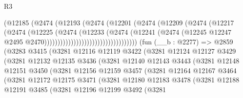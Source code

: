 \begin{lexlean}{R3}
\begin{coremodule}
                                        (@12185
                                          (@2474
                                            (@12193
                                              (@2474
                                                (@12201
                                                  (@2474
                                                    (@12209
                                                      (@2474
                                                        (@12217
                                                          (@2474
                                                            (@12225
                                                              (@2474
                                                                (@12233
                                                                  (@2474
                                                                    (@12241
                                                                      (@2474
                                                                        (@12245
                                                                          @12247
                                                                          @2495
                                                                          @2470)))))))))))))))))))))))))))))))))))
    (fun (__b : @2277) =>
    @2859
      (@3283
        @3415
        (@3281
          @12116
          @12119
          @3422
          (@3281
            @12124
            @12127
            @3429
            (@3281
              @12132
              @12135
              @3436
              (@3281
                @12140
                @12143
                @3443
                (@3281
                  @12148
                  @12151
                  @3450
                  (@3281
                    @12156
                    @12159
                    @3457
                    (@3281
                      @12164
                      @12167
                      @3464
                      (@3281
                        @12172
                        @12175
                        @3471
                        (@3281
                          @12180
                          @12183
                          @3478
                          (@3281
                            @12188
                            @12191
                            @3485
                            (@3281
                              @12196
                              @12199
                              @3492
                              (@3281

\end{coremodule}
\end{lexlean}
